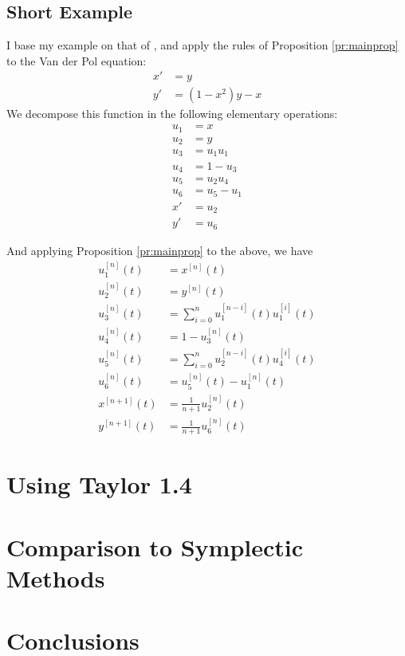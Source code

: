 \documentclass[11pt]{article}
\def\f{\frac }
\begin{document}
\subsection{Short Example}
I base my example on that of \cite{taylor1.4}, and apply the rules of Proposition \ref{pr:mainprop} to the Van der Pol equation:
\begin{align*} x' &= y\\
y' &= (1-x^2)y -x \end{align*}
We decompose this function in the following elementary operations:
\begin{align*}
u_1 &= x\\
u_2 &= y\\
u_3 &= u_1u_1\\
u_4 &= 1 - u_3\\
u_5 &= u_2u_4\\
u_6 &= u_5 - u_1\\
x' &= u_2\\
y' &= u_6\end{align*}

And applying Proposition \ref{pr:mainprop} to the above, we have
\begin{align*}
u_1^{[n]}(t) &= x^{[n]}(t)\\
u_2^{[n]}(t) &= y^{[n]}(t)\\
u_3^{[n]}(t) &= \sum _{i=0} ^n u_1^{[n-i]}(t)u_1^{[i]}(t)\\
u_4^{[n]}(t) &= 1 - u_3^{[n]}(t)\\
u_5^{[n]}(t) &= \sum _{i=0} ^n u_2^{[n-i]}(t)u_4^{[i]}(t)\\
u_6^{[n]}(t) &= u_5^{[n]}(t) - u_1^{[n]}(t)\\
x^{[n+1]}(t) &= \f{1}{n+1}u_2^{[n]}(t)\\
y^{[n+1]}(t) &= \f{1}{n+1}u_6^{[n]}(t)\end{align*}



\pagebreak
\section{Using Taylor 1.4}

\pagebreak
\section{Comparison to Symplectic Methods}

\pagebreak
\section{Conclusions}


\pagebreak


\end{document}
